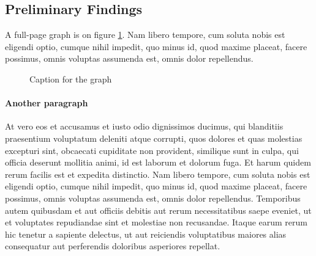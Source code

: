 \documentclass[letterpaper,12pt,leqno]{article}
\newcommand{\pdf}{figures.pdf}
\begin{document}
\subsection{Preliminary Findings}

A full-page graph is on figure \ref{f:graph2}. Nam libero tempore, cum soluta nobis est eligendi optio, cumque nihil impedit, quo minus id, quod maxime placeat, facere possimus, omnis voluptas assumenda est, omnis dolor repellendus.

\begin{figure}[p]
\hfill
{}\vfig
{}\hfill
{}\vfig
{}\hfill
{}
\caption{Caption for the graph}
\label{f:graph2}\end{figure}


\paragraph{Another paragraph} At vero eos et accusamus et iusto odio dignissimos ducimus, qui blanditiis praesentium voluptatum deleniti atque corrupti, quos dolores et quas molestias excepturi sint, obcaecati cupiditate non provident, similique sunt in culpa, qui officia deserunt mollitia animi, id est laborum et dolorum fuga. Et harum quidem rerum facilis est et expedita distinctio. Nam libero tempore, cum soluta nobis est eligendi optio, cumque nihil impedit, quo minus id, quod maxime placeat, facere possimus, omnis voluptas assumenda est, omnis dolor repellendus. Temporibus autem quibusdam et aut officiis debitis aut rerum necessitatibus saepe eveniet, ut et voluptates repudiandae sint et molestiae non recusandae. Itaque earum rerum hic tenetur a sapiente delectus, ut aut reiciendis voluptatibus maiores alias consequatur aut perferendis doloribus asperiores repellat. 
\end{document}
